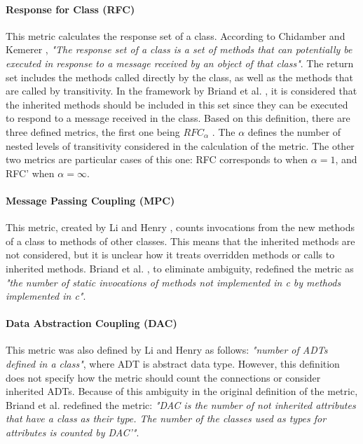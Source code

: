 \paragraph{Response for Class (RFC)} This metric calculates the response set of a class. According to Chidamber and Kemerer \cite{chidamber1994metrics}, \textit{"The response set of a class is a set of methods that can potentially be executed in response to a message received by an object of that class"}. The return set includes the methods called directly by the class, as well as the methods that are called by transitivity. In the framework by Briand et al. \cite{briand1999unified}, it is considered that the inherited methods should be included in this set since they can be executed to respond to a message received in the class. Based on this definition, there are three defined metrics, the first one being $RFC_\alpha$ \cite{churcher1995towards}. The $\alpha$ defines the number of nested levels of transitivity considered in the calculation of the metric. The other two metrics are particular cases of this one: RFC corresponds to when $\alpha = 1$, and RFC' when $\alpha = \infty$.

\paragraph{Message Passing Coupling (MPC)} This metric, created by Li and Henry \cite{li1993object}, counts invocations from the new methods of a class to methods of other classes. This means that the inherited methods are not considered, but it is unclear how it treats overridden methods or calls to inherited methods. Briand et al. \cite{briand1999unified}, to eliminate ambiguity, redefined the metric as \textit{"the number of static invocations of methods not implemented in c by methods implemented in c"}.

\paragraph{Data Abstraction Coupling (DAC)} This metric was also defined by Li and Henry \cite{li1993object} as follows: \textit{"number of ADTs defined in a class"}, where ADT is abstract data type. However, this definition does not specify how the metric should count the connections or consider inherited ADTs. Because of this ambiguity in the original definition of the metric, Briand et al. \cite{briand1999unified} redefined the metric: \textit{"DAC is the number of not inherited attributes that have a class as their type. The number of the classes used as types for attributes is counted by DAC'"}.


